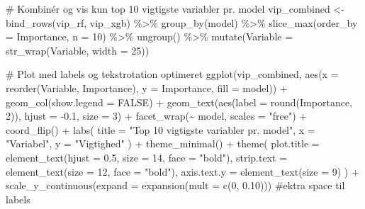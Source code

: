 \documentclass[
  11pt,
  letterpaper,
  DIV=11,
  numbers=noendperiod]{scrartcl}
\newenvironment{Shaded}{\begin{snugshade}}{\end{snugshade}}
\newcommand{\AttributeTok}[1]{\textcolor[rgb]{0.40,0.45,0.13}{#1}}
\newcommand{\CommentTok}[1]{\textcolor[rgb]{0.37,0.37,0.37}{#1}}
\newcommand{\ConstantTok}[1]{\textcolor[rgb]{0.56,0.35,0.01}{#1}}
\newcommand{\DecValTok}[1]{\textcolor[rgb]{0.68,0.00,0.00}{#1}}
\newcommand{\FloatTok}[1]{\textcolor[rgb]{0.68,0.00,0.00}{#1}}
\newcommand{\FunctionTok}[1]{\textcolor[rgb]{0.28,0.35,0.67}{#1}}
\newcommand{\NormalTok}[1]{\textcolor[rgb]{0.00,0.23,0.31}{#1}}
\newcommand{\OtherTok}[1]{\textcolor[rgb]{0.00,0.23,0.31}{#1}}
\newcommand{\SpecialCharTok}[1]{\textcolor[rgb]{0.37,0.37,0.37}{#1}}
\newcommand{\StringTok}[1]{\textcolor[rgb]{0.13,0.47,0.30}{#1}}
\begin{document}
\begin{Shaded}
\begin{Highlighting}[]
\CommentTok{\# Kombinér og vis kun top 10 vigtigste variabler pr. model}
\NormalTok{vip\_combined }\OtherTok{\textless{}{-}} \FunctionTok{bind\_rows}\NormalTok{(vip\_rf, vip\_xgb) }\SpecialCharTok{\%\textgreater{}\%}
  \FunctionTok{group\_by}\NormalTok{(model) }\SpecialCharTok{\%\textgreater{}\%}
  \FunctionTok{slice\_max}\NormalTok{(}\AttributeTok{order\_by =}\NormalTok{ Importance, }\AttributeTok{n =} \DecValTok{10}\NormalTok{) }\SpecialCharTok{\%\textgreater{}\%}
  \FunctionTok{ungroup}\NormalTok{() }\SpecialCharTok{\%\textgreater{}\%}
  \FunctionTok{mutate}\NormalTok{(}\AttributeTok{Variable =} \FunctionTok{str\_wrap}\NormalTok{(Variable, }\AttributeTok{width =} \DecValTok{25}\NormalTok{))}

\CommentTok{\# Plot med labels og tekstrotation optimeret}
\FunctionTok{ggplot}\NormalTok{(vip\_combined, }\FunctionTok{aes}\NormalTok{(}\AttributeTok{x =} \FunctionTok{reorder}\NormalTok{(Variable, Importance), }\AttributeTok{y =}\NormalTok{ Importance, }\AttributeTok{fill =}\NormalTok{ model)) }\SpecialCharTok{+}
  \FunctionTok{geom\_col}\NormalTok{(}\AttributeTok{show.legend =} \ConstantTok{FALSE}\NormalTok{) }\SpecialCharTok{+}
  \FunctionTok{geom\_text}\NormalTok{(}\FunctionTok{aes}\NormalTok{(}\AttributeTok{label =} \FunctionTok{round}\NormalTok{(Importance, }\DecValTok{2}\NormalTok{)), }\AttributeTok{hjust =} \SpecialCharTok{{-}}\FloatTok{0.1}\NormalTok{, }\AttributeTok{size =} \DecValTok{3}\NormalTok{) }\SpecialCharTok{+}
  \FunctionTok{facet\_wrap}\NormalTok{(}\SpecialCharTok{\textasciitilde{}}\NormalTok{ model, }\AttributeTok{scales =} \StringTok{"free"}\NormalTok{) }\SpecialCharTok{+}
  \FunctionTok{coord\_flip}\NormalTok{() }\SpecialCharTok{+}
  \FunctionTok{labs}\NormalTok{(}
    \AttributeTok{title =} \StringTok{"Top 10 vigtigste variabler pr. model"}\NormalTok{,}
    \AttributeTok{x =} \StringTok{"Variabel"}\NormalTok{,}
    \AttributeTok{y =} \StringTok{"Vigtighed"}
\NormalTok{  ) }\SpecialCharTok{+}
  \FunctionTok{theme\_minimal}\NormalTok{() }\SpecialCharTok{+}
  \FunctionTok{theme}\NormalTok{(}
    \AttributeTok{plot.title =} \FunctionTok{element\_text}\NormalTok{(}\AttributeTok{hjust =} \FloatTok{0.5}\NormalTok{, }\AttributeTok{size =} \DecValTok{14}\NormalTok{, }\AttributeTok{face =} \StringTok{"bold"}\NormalTok{),}
    \AttributeTok{strip.text =} \FunctionTok{element\_text}\NormalTok{(}\AttributeTok{size =} \DecValTok{12}\NormalTok{, }\AttributeTok{face =} \StringTok{"bold"}\NormalTok{),}
    \AttributeTok{axis.text.y =} \FunctionTok{element\_text}\NormalTok{(}\AttributeTok{size =} \DecValTok{9}\NormalTok{)}
\NormalTok{  ) }\SpecialCharTok{+}
  \FunctionTok{scale\_y\_continuous}\NormalTok{(}\AttributeTok{expand =} \FunctionTok{expansion}\NormalTok{(}\AttributeTok{mult =} \FunctionTok{c}\NormalTok{(}\DecValTok{0}\NormalTok{, }\FloatTok{0.10}\NormalTok{))) }\CommentTok{\#ektra space til labels}
\end{Highlighting}
\end{Shaded}
\end{document}
